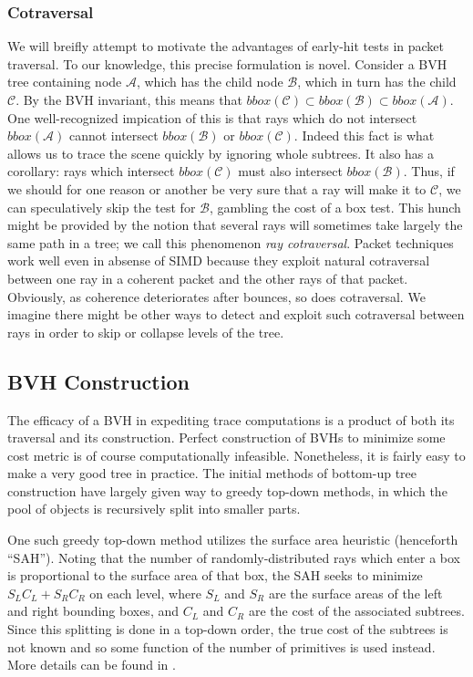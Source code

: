 \documentclass[twocolumn]{article}
\begin{document}
\subsubsection{Cotraversal}

We will breifly attempt to motivate the advantages of early-hit tests in packet traversal.  To our knowledge, this precise formulation is novel.  Consider a BVH tree containing node $\mathcal{A}$, which has the child node $\mathcal{B}$, which in turn has the child $\mathcal{C}$.  By the BVH invariant, this means that $\mathit{bbox}(\mathcal{C})\subset \mathit{bbox}(\mathcal{B})\subset \mathit{bbox}(\mathcal{A})$.  One well-recognized impication of this is that rays which do not intersect $\mathit{bbox}(\mathcal{A})$ cannot intersect $\mathit{bbox}(\mathcal{B})$ or $\mathit{bbox}(\mathcal{C})$.  Indeed this fact is what allows us to trace the scene quickly by ignoring whole subtrees.  It also has a corollary: rays which intersect $\mathit{bbox}(\mathcal{C})$ must also intersect $\mathit{bbox}(\mathcal{B})$. Thus, if we should for one reason or another be very sure that a ray will make it to $\mathcal{C}$, we can speculatively skip the test for $\mathcal{B}$, gambling the cost of a box test.  This hunch might be provided by the notion that several rays will sometimes take largely the same path in a tree; we call this phenomenon {\it ray cotraversal}.  Packet techniques work well even in absense of SIMD because they exploit natural cotraversal between one ray in a coherent packet and the other rays of that packet.  Obviously, as coherence deteriorates after bounces, so does cotraversal.  We imagine there might be other ways to detect and exploit such cotraversal between rays in order to skip or collapse levels of the tree.  

\subsection{BVH Construction}

The efficacy of a BVH in expediting trace computations is a product of both its traversal and its construction.  Perfect construction of BVHs to minimize some cost metric is of course computationally infeasible.  Nonetheless, it is fairly easy to make a very good tree in practice.  The initial methods of bottom-up tree construction have largely given way to greedy top-down methods, in which the pool of objects is recursively split into smaller parts.

One such greedy top-down method utilizes the surface area heuristic (henceforth ``SAH'').  Noting that the number of randomly-distributed rays which enter a box is proportional to the surface area of that box, the SAH seeks to minimize $S_L C_L +S_R C_R$ on each level, where $S_L$ and $S_R$ are the surface areas of the left and right bounding boxes, and $C_L$ and $C_R$ are the cost of the associated subtrees.  Since this splitting is done in a top-down order, the true cost of the subtrees is not known and so some function of the number of primitives is used instead.  More details can be found in \cite{Kensler08, Wald07}.
\end{document}
